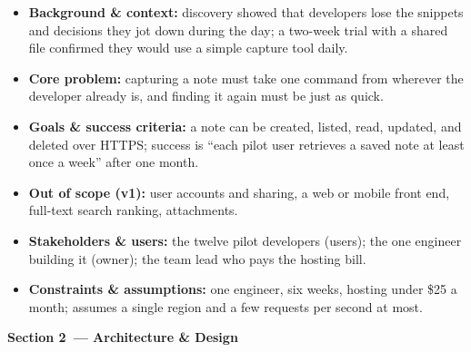 \begin{itemize}
\tightlist
\item
  \textbf{Background \& context:} discovery showed that developers lose the snippets and decisions they jot down during the day; a two-week trial with a shared file confirmed they would use a simple capture tool daily.
\item
  \textbf{Core problem:} capturing a note must take one command from wherever the developer already is, and finding it again must be just as quick.
\item
  \textbf{Goals \& success criteria:} a note can be created, listed, read, updated, and deleted over HTTPS; success is ``each pilot user retrieves a saved note at least once a week'' after one month.
\item
  \textbf{Out of scope (v1):} user accounts and sharing, a web or mobile front end, full-text search ranking, attachments.
\item
  \textbf{Stakeholders \& users:} the twelve pilot developers (users); the one engineer building it (owner); the team lead who pays the hosting bill.
\item
  \textbf{Constraints \& assumptions:} one engineer, six weeks, hosting under \$25 a month; assumes a single region and a few requests per second at most.
\end{itemize}

\noindent{}\textbf{Section 2~--- Architecture \& Design}

